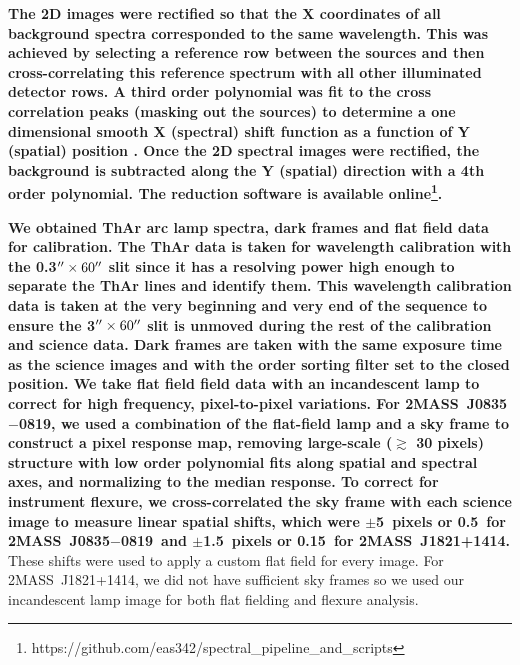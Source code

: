 \documentclass[twocolumn]{aastex6}
\newcommand{\sha}{2MASS~J0835$-$0819}
\newcommand{\shb}{2MASS~J1821+1414}
\begin{document}
\textbf{The 2D images were rectified so that the X coordinates of all background spectra corresponded to the same wavelength.
This was achieved by selecting a reference row between the sources and then cross-correlating this reference spectrum with all other illuminated detector rows.
A third order polynomial was fit to the cross correlation peaks (masking out the sources) to determine a one dimensional smooth X (spectral) shift function as a function of Y (spatial) position  \citep{2016ApJ...826..156S}.
Once the 2D spectral images were rectified, the background is subtracted along the Y (spatial) direction with a 4th order polynomial.
The reduction software is available online\footnote{https://github.com/eas342/spectral\_pipeline\_and\_scripts}.}
 
\textbf{We obtained ThAr arc lamp spectra, dark frames and flat field data for calibration.
The ThAr data is taken for wavelength calibration with the 0.3$\mbox{$^{\prime\prime}$}\times60\mbox{$^{\prime\prime}$}$ slit since it has a resolving power high enough to separate the ThAr lines and identify them.
This wavelength calibration data is taken at the very beginning and very end of the sequence to ensure the 3$\mbox{$^{\prime\prime}$} \times 60 \mbox{$^{\prime\prime}$}$ slit is unmoved during the rest of the calibration and science data.
Dark frames are taken with the same exposure time as the science images and with the order sorting filter set to the closed position.
We take flat field field data with an incandescent lamp to correct for high frequency, pixel-to-pixel variations.
For {\sha}, we used a combination of the flat-field lamp and a sky frame to construct a pixel response map, removing large-scale ($\gtrsim$ 30 pixels) structure with low order polynomial fits along spatial and spectral axes, and normalizing to the median response. 
To correct for instrument flexure, we cross-correlated the sky frame with each science image to measure linear spatial shifts, which were $\pm$5~pixels or 0.5\arcsec\ for \sha\ and $\pm$1.5~pixels or 0.15\arcsec\ for \shb.}
These shifts were used to apply a custom flat field for every image.
For {\shb}, we did not have sufficient sky frames so we used our incandescent lamp image for both flat fielding and flexure analysis.
\end{document}

